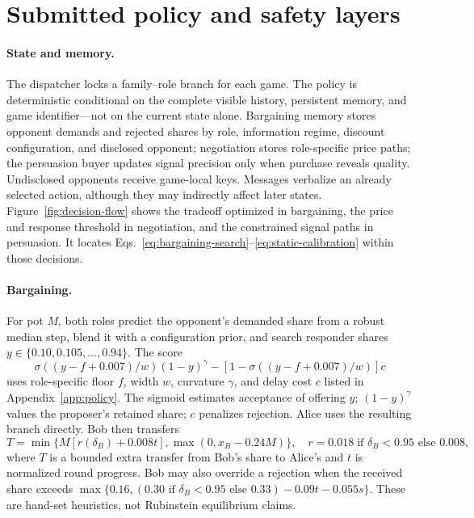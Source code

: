 \section{Submitted policy and safety layers}

\paragraph{State and memory.}
The dispatcher locks a family--role branch for each game. The policy is
deterministic conditional on the complete visible history, persistent memory,
and game identifier---not on the current state alone. Bargaining memory stores
opponent demands and rejected shares by role, information regime, discount
configuration, and disclosed opponent; negotiation stores role-specific price
paths; the persuasion buyer updates signal precision only when purchase reveals
quality. Undisclosed opponents receive game-local keys. Messages verbalize an
already selected action, although they may indirectly affect later states.
Figure~\ref{fig:decision-flow} shows the tradeoff optimized in bargaining,
the price and response threshold in negotiation, and the constrained signal
paths in persuasion. It locates Eqs.~\ref{eq:bargaining-search}--\ref{eq:static-calibration}
within those decisions.



\paragraph{Bargaining.}
For pot $M$, both roles predict the opponent's demanded share from a robust
median step, blend it with a configuration prior, and search responder shares
$y\in\{0.10,0.105,\ldots,0.94\}$. The score
\begin{equation}
 \sigma((y-f+0.007)/w)(1-y)^\gamma-
 [1-\sigma((y-f+0.007)/w)]c
 \label{eq:bargaining-search}
\end{equation}
uses role-specific floor $f$, width $w$, curvature $\gamma$, and delay cost
$c$ listed in Appendix~\ref{app:policy}. The sigmoid estimates acceptance of
offering $y$; $(1-y)^\gamma$ values the proposer's retained share; $c$ penalizes
rejection. Alice uses the resulting branch
directly. Bob then transfers
\begin{equation}
 T=\min\{M[r(\delta_B)+0.008t],\max(0,x_B-0.24M)\},
 \quad r=0.018\;\text{if }\delta_B<0.95\text{ else }0.008,
 \label{eq:bob-transfer}
\end{equation}
where $T$ is a bounded extra transfer from Bob's share to Alice's and $t$
is normalized round progress. Bob may also override a rejection when the received share exceeds
$\max\{0.16,(0.30\text{ if }\delta_B<0.95\text{ else }0.33)-0.09t-0.055s\}$.
These are hand-set heuristics, not Rubinstein equilibrium claims.

